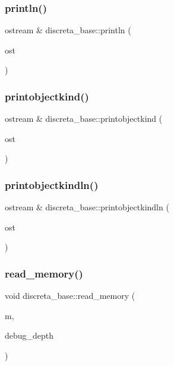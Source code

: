 \subsubsection{\texorpdfstring{println()}{println()}}
{\footnotesize\ttfamily ostream \& discreta\+\_\+base\+::println (\begin{DoxyParamCaption}\item[{ostream \&}]{ost }\end{DoxyParamCaption})}

\mbox{\label{classdiscreta__base_aa75a1314aa706909b029664944904231}} 
\subsubsection{\texorpdfstring{printobjectkind()}{printobjectkind()}}
{\footnotesize\ttfamily ostream \& discreta\+\_\+base\+::printobjectkind (\begin{DoxyParamCaption}\item[{ostream \&}]{ost }\end{DoxyParamCaption})}

\mbox{\label{classdiscreta__base_a677ccc8f392ebedde05e453f8cf59559}} 
\subsubsection{\texorpdfstring{printobjectkindln()}{printobjectkindln()}}
{\footnotesize\ttfamily ostream \& discreta\+\_\+base\+::printobjectkindln (\begin{DoxyParamCaption}\item[{ostream \&}]{ost }\end{DoxyParamCaption})}

\mbox{\label{classdiscreta__base_a224239da232eb4165783845a48e8b170}} 
\subsubsection{\texorpdfstring{read\+\_\+memory()}{read\_memory()}}
{\footnotesize\ttfamily void discreta\+\_\+base\+::read\+\_\+memory (\begin{DoxyParamCaption}\item[{\mbox{\hyperlink{classmemory}{memory}} \&}]{m,  }\item[{\mbox{\hyperlink{galois_8h_a09fddde158a3a20bd2dcadb609de11dc}{I\+NT}}}]{debug\+\_\+depth }\end{DoxyParamCaption})}

